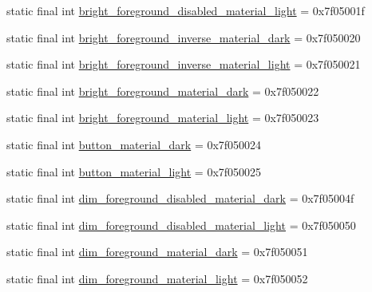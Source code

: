 \begin{DoxyCompactItemize}
\item 
static final int \mbox{\hyperlink{classandroid_1_1support_1_1v7_1_1appcompat_1_1R_1_1color_a33c7c2b4401cb8356a155a1afe362b47}{bright\+\_\+foreground\+\_\+disabled\+\_\+material\+\_\+light}} = 0x7f05001f
\item 
static final int \mbox{\hyperlink{classandroid_1_1support_1_1v7_1_1appcompat_1_1R_1_1color_a1aa7ffb5447caf2b78c940133396d6d7}{bright\+\_\+foreground\+\_\+inverse\+\_\+material\+\_\+dark}} = 0x7f050020
\item 
static final int \mbox{\hyperlink{classandroid_1_1support_1_1v7_1_1appcompat_1_1R_1_1color_ab4869d9734586f545a779eda36be9aea}{bright\+\_\+foreground\+\_\+inverse\+\_\+material\+\_\+light}} = 0x7f050021
\item 
static final int \mbox{\hyperlink{classandroid_1_1support_1_1v7_1_1appcompat_1_1R_1_1color_a4597a12719cad1f96c80e5f687750001}{bright\+\_\+foreground\+\_\+material\+\_\+dark}} = 0x7f050022
\item 
static final int \mbox{\hyperlink{classandroid_1_1support_1_1v7_1_1appcompat_1_1R_1_1color_ad034dc588b96d089b75eaa50a7c58b7b}{bright\+\_\+foreground\+\_\+material\+\_\+light}} = 0x7f050023
\item 
static final int \mbox{\hyperlink{classandroid_1_1support_1_1v7_1_1appcompat_1_1R_1_1color_a5d1d5941ab6420731c5843ae63fe0789}{button\+\_\+material\+\_\+dark}} = 0x7f050024
\item 
static final int \mbox{\hyperlink{classandroid_1_1support_1_1v7_1_1appcompat_1_1R_1_1color_a0f55ddca8d19bdc92c55d9e24598b13c}{button\+\_\+material\+\_\+light}} = 0x7f050025
\item 
static final int \mbox{\hyperlink{classandroid_1_1support_1_1v7_1_1appcompat_1_1R_1_1color_a9ad8f0e9c7d60cc65f1e0be267909069}{dim\+\_\+foreground\+\_\+disabled\+\_\+material\+\_\+dark}} = 0x7f05004f
\item 
static final int \mbox{\hyperlink{classandroid_1_1support_1_1v7_1_1appcompat_1_1R_1_1color_a73560b92d6f0a6237771fa45d9043f04}{dim\+\_\+foreground\+\_\+disabled\+\_\+material\+\_\+light}} = 0x7f050050
\item 
static final int \mbox{\hyperlink{classandroid_1_1support_1_1v7_1_1appcompat_1_1R_1_1color_a7c7a0aed93dcef9ce70bae142c8c1686}{dim\+\_\+foreground\+\_\+material\+\_\+dark}} = 0x7f050051
\item 
static final int \mbox{\hyperlink{classandroid_1_1support_1_1v7_1_1appcompat_1_1R_1_1color_a12eb2c3fd6ba2ffd247cebc75ac00b5c}{dim\+\_\+foreground\+\_\+material\+\_\+light}} = 0x7f050052

\end{DoxyCompactItemize}
